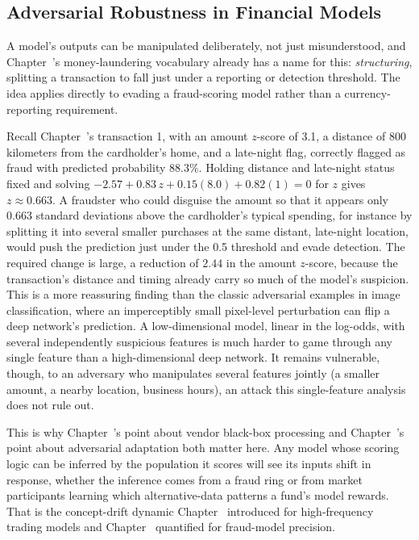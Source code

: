 \documentclass[../ai_in_finance]{subfiles}
\begin{document}
\subsection{Adversarial Robustness in Financial Models}
\label{sec:adversarial-robustness}

A model's outputs can be manipulated deliberately, not just misunderstood, and Chapter~'s money-laundering vocabulary already has a name for this: \emph{structuring}, splitting a transaction to fall just under a reporting or detection threshold. The idea applies directly to evading a fraud-scoring model rather than a currency-reporting requirement.

Recall Chapter~'s transaction 1, with an amount $z$-score of 3.1, a distance of 800 kilometers from the cardholder's home, and a late-night flag, correctly flagged as fraud with predicted probability $88.3\%$. Holding distance and late-night status fixed and solving $-2.57 + 0.83\,z + 0.15(8.0) + 0.82(1) = 0$ for $z$ gives $z \approx 0.663$. A fraudster who could disguise the amount so that it appears only $0.663$ standard deviations above the cardholder's typical spending, for instance by splitting it into several smaller purchases at the same distant, late-night location, would push the prediction just under the 0.5 threshold and evade detection. The required change is large, a reduction of $2.44$ in the amount $z$-score, because the transaction's distance and timing already carry so much of the model's suspicion. This is a more reassuring finding than the classic adversarial examples in image classification, where an imperceptibly small pixel-level perturbation \parencite{goodfellow2015explaining} can flip a deep network's prediction. A low-dimensional model, linear in the log-odds, with several independently suspicious features is much harder to game through any single feature than a high-dimensional deep network. It remains vulnerable, though, to an adversary who manipulates several features jointly (a smaller amount, a nearby location, business hours), an attack this single-feature analysis does not rule out.

This is why Chapter~'s point about vendor black-box processing and Chapter~'s point about adversarial adaptation both matter here. Any model whose scoring logic can be inferred by the population it scores will see its inputs shift in response, whether the inference comes from a fraud ring or from market participants learning which alternative-data patterns a fund's model rewards. That is the concept-drift dynamic Chapter~ introduced for high-frequency trading models and Chapter~ quantified for fraud-model precision.
\end{document}
